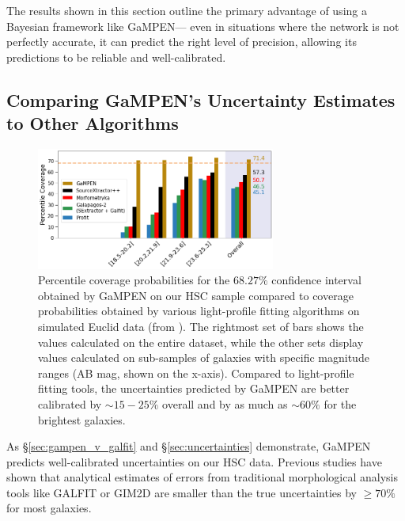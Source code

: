 \documentclass[linenumbers,twocolumn,twocolappendix]{aastex631}
\newcommand\gampen{GaMPEN}
\begin{document}
\begin{CJK*}{UTF8}{gbsn}
The results shown in this section outline the primary advantage of using a Bayesian framework like \gampen{}--- even in situations where the network is not perfectly accurate, it can predict the right level of precision, allowing its predictions to be reliable and well-calibrated.

\subsection{Comparing \gampen{}'s Uncertainty Estimates to Other Algorithms}
\label{sec:uncer_comp}

\begin{figure}[htb]
    \centering
    \includegraphics[width = 0.7\textwidth]{cov_prob_euclud_comp.png}
    \caption{Percentile coverage probabilities for the $68.27\%$ confidence interval obtained by \gampen{} on our HSC sample compared to coverage probabilities obtained by various light-profile fitting algorithms on simulated Euclid data %
    (from \citealp{euclid_morph}). The rightmost set of bars shows the values calculated on the entire dataset, while the other sets display values calculated on sub-samples of galaxies with specific magnitude ranges (AB mag, shown on the x-axis). %
    Compared to light-profile fitting tools, the uncertainties predicted by \gampen{} are better calibrated by $\sim15-25\%$ overall and by as much as $\sim60\%$ for the brightest galaxies.}
    \label{fig:cov_prob_comp_euclud}
\end{figure}

As \S \ref{sec:gampen_v_galfit} and \S\ref{sec:uncertainties} demonstrate, \gampen{} predicts well-calibrated uncertainties on our HSC data. Previous studies \citep[e.g.,][]{haussler_07} have shown that analytical estimates of errors from traditional morphological analysis tools like GALFIT or GIM2D \citep{gim2d} are smaller than the true uncertainties by $\geq70\%$ for most galaxies.


\end{CJK*}
\end{document}
